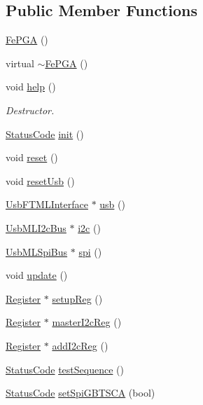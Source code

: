 \subsection*{Public Member Functions}
\begin{DoxyCompactItemize}
\item 
\hyperlink{classFePGA_a377ae8860fbb3162e0c49dd08197a670}{Fe\+P\+GA} ()
\item 
virtual \hyperlink{classFePGA_aa445095a44c521b6b7803feaef6c16ba}{$\sim$\+Fe\+P\+GA} ()
\item 
void \hyperlink{classFePGA_ae6425fbad1a8db57025efaf387a6f41b}{help} ()
\begin{DoxyCompactList}\small\item\em Destructor. \end{DoxyCompactList}\item 
\hyperlink{classStatusCode}{Status\+Code} \hyperlink{classFePGA_a5355858b1b8deedcc12acff80f025804}{init} ()
\item 
void \hyperlink{classFePGA_abdf7a9dd901351a7eafd748d35172a3c}{reset} ()
\item 
void \hyperlink{classFePGA_a79d95b2fccf4d2ea473e6cf6980d6cf6}{reset\+Usb} ()
\item 
\hyperlink{classUsbFTMLInterface}{Usb\+F\+T\+M\+L\+Interface} $\ast$ \hyperlink{classFePGA_a4a7889dc3c2f88f623876ca475e66410}{usb} ()
\item 
\hyperlink{classUsbMLI2cBus}{Usb\+M\+L\+I2c\+Bus} $\ast$ \hyperlink{classFePGA_a1553db5010cce9e3495aa3060baf0b3c}{i2c} ()
\item 
\hyperlink{classUsbMLSpiBus}{Usb\+M\+L\+Spi\+Bus} $\ast$ \hyperlink{classFePGA_ab54f9f61e87f1cced6c4ba19eb38a848}{spi} ()
\item 
void \hyperlink{classFePGA_ad23605ae261d2aa0562cbb732661b2c4}{update} ()
\item 
\hyperlink{classRegister}{Register} $\ast$ \hyperlink{classFePGA_aa0657c6ef809f3f6b54613f237750cc4}{setup\+Reg} ()
\item 
\hyperlink{classRegister}{Register} $\ast$ \hyperlink{classFePGA_a2bcd2c468fc3e1bcadc9bd8800b325a0}{master\+I2c\+Reg} ()
\item 
\hyperlink{classRegister}{Register} $\ast$ \hyperlink{classFePGA_a64feabdb09e65b1b4b1376a4da713570}{add\+I2c\+Reg} ()
\item 
\hyperlink{classStatusCode}{Status\+Code} \hyperlink{classFePGA_a3d5a3231a960cd451bb37bb9120422e9}{test\+Sequence} ()
\item 
\hyperlink{classStatusCode}{Status\+Code} \hyperlink{classFePGA_a59b840619341df26918a6c26e8b8e72b}{set\+Spi\+G\+B\+T\+S\+CA} (bool)

\end{DoxyCompactItemize}
